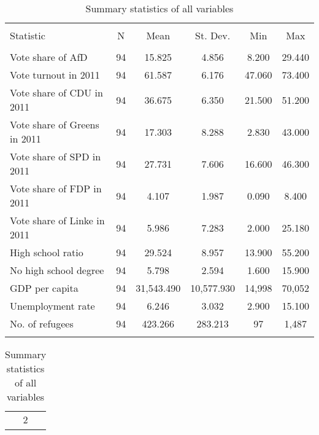 
\begin{table}[!htbp] \centering 
  \caption{Summary statistics of all variables} 
  \label{} 
\small 
\begin{tabular}{@{\extracolsep{5pt}}lccccc} 
\\[-1.8ex]\hline 
\hline \\[-1.8ex] 
Statistic & \multicolumn{1}{c}{N} & \multicolumn{1}{c}{Mean} & \multicolumn{1}{c}{St. Dev.} & \multicolumn{1}{c}{Min} & \multicolumn{1}{c}{Max} \\ 
\hline \\[-1.8ex] 
Vote share of AfD & 94 & 15.825 & 4.856 & 8.200 & 29.440 \\ 
Vote turnout in 2011 & 94 & 61.587 & 6.176 & 47.060 & 73.400 \\ 
Vote share of CDU in 2011 & 94 & 36.675 & 6.350 & 21.500 & 51.200 \\ 
Vote share of Greens in 2011 & 94 & 17.303 & 8.288 & 2.830 & 43.000 \\ 
Vote share of SPD in 2011 & 94 & 27.731 & 7.606 & 16.600 & 46.300 \\ 
Vote share of FDP in 2011 & 94 & 4.107 & 1.987 & 0.090 & 8.400 \\ 
Vote share of Linke in 2011 & 94 & 5.986 & 7.283 & 2.000 & 25.180 \\ 
High school ratio & 94 & 29.524 & 8.957 & 13.900 & 55.200 \\ 
No high school degree & 94 & 5.798 & 2.594 & 1.600 & 15.900 \\ 
GDP per capita & 94 & 31,543.490 & 10,577.930 & 14,998 & 70,052 \\ 
Unemployment rate & 94 & 6.246 & 3.032 & 2.900 & 15.100 \\ 
No. of refugees & 94 & 423.266 & 283.213 & 97 & 1,487 \\ 
\hline \\[-1.8ex] 
\end{tabular} 
\end{table} 

\begin{table}[!htbp] \centering 
  \caption{Summary statistics of all variables} 
  \label{} 
\small 
\begin{tabular}{@{\extracolsep{5pt}} c} 
\\[-1.8ex]\hline 
\hline \\[-1.8ex] 
$2$ \\ 
\hline \\[-1.8ex] 
\end{tabular} 
\end{table} 
